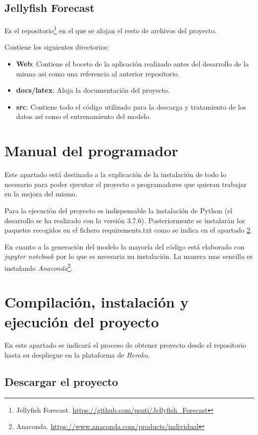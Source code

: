 \subsection{Jellyfish Forecast}
Es el repositorio\footnote{Jellyfish Forecast. \url{https://github.com/psnti/Jellyfish_Forecast}} en el que se alojan el resto de archivos del proyecto.

Contiene los siguientes directorios:
\begin{itemize}
	\item \textbf{Web}: Contiene el boceto de la aplicación realizado antes del desarrollo de la misma asi como una referencia al anterior repositorio.
	\item \textbf{docs/latex}: Aloja la documentación del proyecto.
	\item \textbf{src}: Contiene todo el código utilizado para la descarga y tratamiento de los datos así como el entrenamiento del modelo.
\end{itemize}

\section{Manual del programador}

Este apartado está destinado a la explicación de la instalación de todo lo necesario para poder ejecutar el proyecto o programadores que quieran trabajar en la mejora del mismo.

Para la ejecución del proyecto es indispensable la instalación de Python (el desarrollo se ha realizado con la versión 3.7.6). Posteriormente se instalarán los paquetes recogidos en el fichero requirements.txt como se indica en el apartado \ref{D4}.

En cuanto a la generación del modelo la mayoría del código está elaborado con \emph{jupyter notebook} por lo que es necesaria nu instalación. La manera mas sencilla es instalando \emph{Anaconda}\footnote{Anaconda. \url{https://www.anaconda.com/products/individual}}.

\section{Compilación, instalación y ejecución del proyecto}\label{D4}

En este apartado se indicará el proceso de obtener proyecto desde el repositorio hasta su despliegue en la plataforma de \emph{Heroku}.

\subsection{Descargar el proyecto}\label{Descarga}


